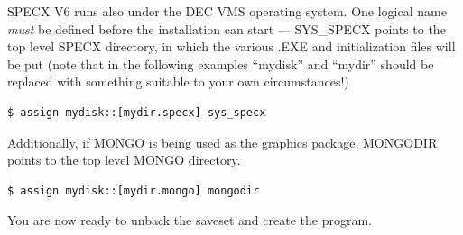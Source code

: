 \documentclass[11pt,twoside]{report}
\begin{document}
SPECX V6 runs also under the DEC VMS operating system. One logical
name {\em must} be defined before the
installation can start --- SYS\_SPECX points to
the top level SPECX directory, in which the various .EXE and initialization
files will be put (note that in the following examples ``mydisk'' and ``mydir''
should be replaced with something suitable to your own circumstances!)\\
\begin{verbatim}
$ assign mydisk::[mydir.specx] sys_specx
\end{verbatim}

Additionally, if MONGO is being used as the graphics package,
MONGODIR points to the top level MONGO
directory.
\begin{verbatim}
$ assign mydisk::[mydir.mongo] mongodir
\end{verbatim}

You are now ready to unback the saveset and create the program.
\end{document}
